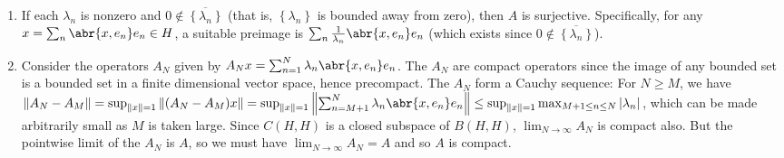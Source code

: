 \documentclass[11pt,leqno]{article}
\theoremstyle{plain}
\theoremstyle{definition}
\numberwithin{equation}{section}
\numberwithin{lem}{section}
\newcommand{\cbr}[1]{\left\{#1\right\}}
\begin{document}
\begin{enumerate}
\begin{enumerate}
      \item If each $\lambda_n$ is nonzero and $0\not \in\overline{\cbr{\lambda_n}}$ (that is, $\cbr{\lambda_n}$ is bounded away from zero), then $A$ is surjective. Specifically, for any $x = \sum_n\abr{x,e_n}e_n\in H$, a suitable preimage is $\sum_n\frac{1}{\lambda_n}\abr{x,e_n}e_n$ (which exists since $0\not \in\overline{\cbr{\lambda_n}}$).
      \item Consider the operators $A_N$ given by $A_Nx = \sum_{n=1}^N\lambda_n\abr{x,e_n}e_n$. The $A_N$ are compact operators since the image of any bounded set is a bounded set in a finite dimensional vector space, hence precompact. The $A_N$ form a Cauchy sequence: For $N\geq M$, we have $\norm{A_N-A_M} = \sup_{\norm{x} = 1}\norm{(A_N-A_M)x} = \sup_{\norm{x} = 1}\norm{\sum_{n=M+1}^N\lambda_n\abr{x,e_n}e_n} \leq \sup_{\norm{x} = 1}\max_{M+1\leq n\leq N}\abs{\lambda_n}$, which can be made arbitrarily small as $M$ is taken large. Since $C(H,H)$ is a closed subspace of $B(H,H)$, $\lim_{N\to\infty}A_N$ is compact also. But the pointwise limit of the $A_N$ is $A$, so we must have $\lim_{N\to\infty}A_N = A$ and so $A$ is compact.
    \end{enumerate}
\end{enumerate}
\end{document}
